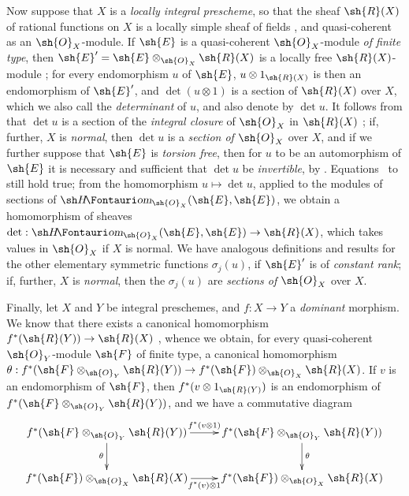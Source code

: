 \begin{env}[6.4.9]
\label{II.6.4.9}
Now suppose that $X$ is a \emph{locally integral prescheme}, so that the sheaf $\sh{R}(X)$ of rational functions on $X$ is a locally simple sheaf of fields , and quasi-coherent as an $\sh{O}_X$-module.
If $\sh{E}$ is a quasi-coherent $\sh{O}_X$-module \emph{of finite type}, then $\sh{E}'=\sh{E}\otimes_{\sh{O}_X}\sh{R}(X)$ is a locally free $\sh{R}(X)$-module ;
for every endomorphism $u$ of $\sh{E}$, $u\otimes1_{\sh{R}(X)}$ is then an endomorphism of $\sh{E}'$, and $\det(u\otimes1)$ is a section of $\sh{R}(X)$ over $X$, which we also call the \emph{determinant} of $u$, and also denote by $\det u$.
It follows from  that $\det u$ is a section of the \emph{integral closure} of $\sh{O}_X$ in $\sh{R}(X)$ ;
if, further, $X$ is \emph{normal}, then $\det u$ is a \emph{section of $\sh{O}_X$} over $X$, and if we further suppose that $\sh{E}$ is \emph{torsion free}, then for $u$ to be an automorphism of $\sh{E}$ it is necessary and sufficient that $\det u$ be \emph{invertible}, by .
Equations~ to  still hold true;
from the homomorphism $u\mapsto\det u$, applied to the modules of sections of $\shHom_{\sh{O}_X}(\sh{E},\sh{E})$, we obtain a homomorphism of sheaves $\det:\shHom_{\sh{O}_X}(\sh{E},\sh{E})\to\sh{R}(X)$, which takes values in $\sh{O}_X$ if $X$ is normal.
We have analogous definitions and results for the other elementary symmetric functions $\sigma_j(u)$, if $\sh{E}'$ is of \emph{constant rank};
if, further, $X$ is \emph{normal}, then the $\sigma_j(u)$ are \emph{sections of $\sh{O}_X$} over $X$.

Finally, let $X$ and $Y$ be integral preschemes, and $f:X\to Y$ a \emph{dominant} morphism.
We know that there exists a canonical homomorphism $f^*(\sh{R}(Y))\to\sh{R}(X)$ , whence we obtain, for every quasi-coherent $\sh{O}_Y$-module $\sh{F}$ of finite type, a canonical homomorphism $\theta:f^*(\sh{F}\otimes_{\sh{O}_Y}\sh{R}(Y))\to f^*(\sh{F})\otimes_{\sh{O}_X}\sh{R}(X)$.
If $v$ is an endomorphism of $\sh{F}$, then $f^*(v\otimes1_{\sh{R}(Y)})$ is an endomorphism of $f^*(\sh{F}\otimes_{\sh{O}_Y}\sh{R}(Y))$, and we have a commutative diagram
\[
  \xymatrix{
    f^*(\sh{F}\otimes_{\sh{O}_Y}\sh{R}(Y))
      \ar[r]^{f^*(v\otimes1)}
      \ar[d]_{\theta}
    & f^*(\sh{F}\otimes_{\sh{O}_Y}\sh{R}(Y))
      \ar[d]^{\theta}
  \\f^*(\sh{F})\otimes_{\sh{O}_X}\sh{R}(X)
      \ar[r]_{f^*(v)\otimes1}
    & f^*(\sh{F})\otimes_{\sh{O}_X}\sh{R}(X)
  }
\]


\end{env}
